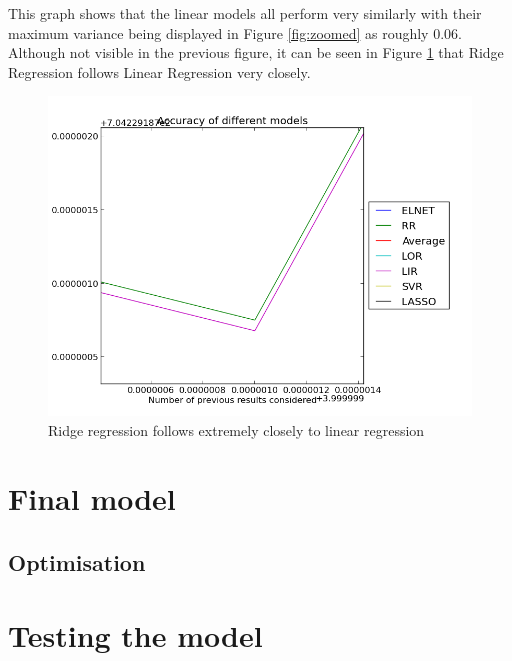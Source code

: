 This graph shows that the linear models all perform very similarly with their maximum variance being displayed in Figure \ref{fig:zoomed} as roughly 0.06. Although not visible in the previous figure, it can be seen in Figure \ref{fig:whereisrr} that Ridge Regression follows Linear Regression very closely.

\begin{figure}[p]
\centering
\includegraphics[width=1\textwidth]{images/whereisrr.png}
\caption{Ridge regression follows extremely closely to linear regression}
\label{fig:whereisrr}
\end{figure}


\section{Final model}

\subsection{Optimisation}

\section{Testing the model}
